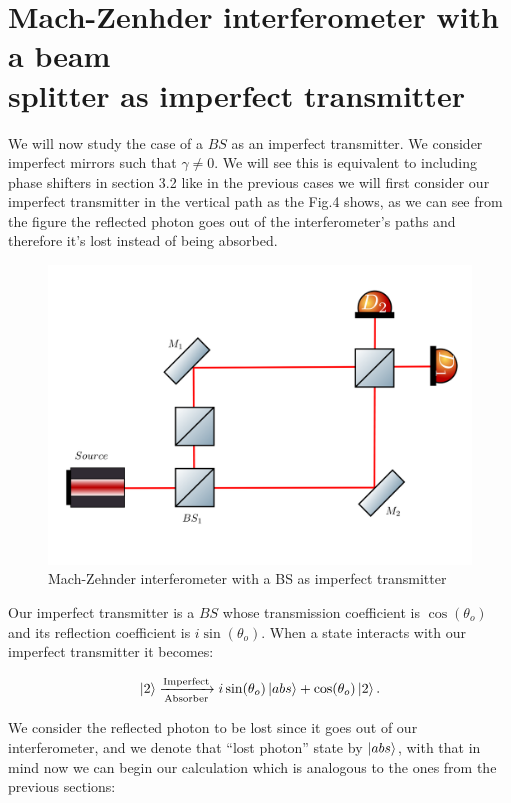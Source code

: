 \documentclass[12pt]{article}
\begin{document}
\pagebreak

\blankpage{}

\section{Mach-Zenhder interferometer with a beam \\ splitter as imperfect transmitter}

We will now study the case of a $BS$ as an imperfect transmitter. We consider imperfect mirrors such that $\gamma \neq 0$. We will see this is equivalent to including phase shifters in section 3.2 like in the previous cases we will first consider our imperfect transmitter in the vertical path as the Fig.4 shows, as we can see from the figure the reflected photon goes out of the interferometer's paths and therefore it's lost instead of being absorbed.

\begin{figure}[h!]
\centering
\includegraphics[width=\linewidth,height=7.5 cm]{images/machzenhderbs.png}
\caption{Mach-Zehnder interferometer with a BS as imperfect transmitter}
\label{fig:BS2}
\end{figure}

Our imperfect transmitter is a $BS$ whose transmission coefficient is $\cos(\theta_{o})$ and its reflection coefficient is $i\sin(\theta_{o})$. When a state interacts with our imperfect transmitter it becomes:

\begin{align}
\ket{2}\xrightarrow[\text{Absorber}]{\text{Imperfect}}i\sin(\theta_{o}) \ket{abs} +\cos(\theta_{o}) \ket{2}.
\end{align}

We consider the reflected photon to be lost since it goes out of our interferometer, and we denote that ``lost photon'' state by $\ket{abs}$, with that in mind now we can begin our calculation which is analogous to the ones from the previous sections:
\end{document}
